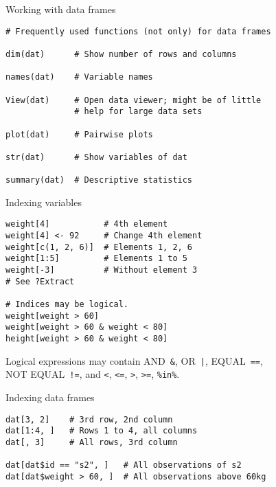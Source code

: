 \documentclass[aspectratio=169]{beamer}
\begin{document}
\begin{frame}[fragile]{Working with data frames}

\begin{lstlisting}
# Frequently used functions (not only) for data frames

dim(dat)      # Show number of rows and columns

names(dat)    # Variable names

View(dat)     # Open data viewer; might be of little 
              # help for large data sets

plot(dat)     # Pairwise plots

str(dat)      # Show variables of dat

summary(dat)  # Descriptive statistics
\end{lstlisting}
\end{frame}


\begin{frame}[fragile]{Indexing variables}

\begin{lstlisting}
weight[4]           # 4th element
weight[4] <- 92     # Change 4th element
weight[c(1, 2, 6)]  # Elements 1, 2, 6
weight[1:5]         # Elements 1 to 5
weight[-3]          # Without element 3
# See ?Extract

# Indices may be logical.
weight[weight > 60]
weight[weight > 60 & weight < 80]
height[weight > 60 & weight < 80]
\end{lstlisting}

Logical expressions may contain AND~\texttt{\&}, OR~\texttt{|},
  EQUAL~\texttt{==},\\ NOT EQUAL~\texttt{!=}, and \texttt{<}, \texttt{<=},
  \texttt{>}, \texttt{>=}, \texttt{\%in\%}.
\end{frame}


\begin{frame}[fragile]{Indexing data frames}

\begin{lstlisting}
dat[3, 2]    # 3rd row, 2nd column
dat[1:4, ]   # Rows 1 to 4, all columns
dat[, 3]     # All rows, 3rd column

dat[dat$id == "s2", ]   # All observations of s2
dat[dat$weight > 60, ]  # All observations above 60kg
\end{lstlisting}
\end{frame}

% 
\end{document}
